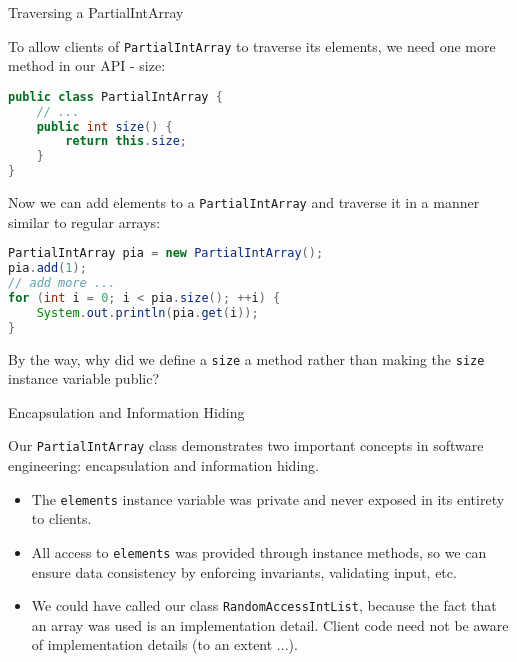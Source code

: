 \documentclass{beamer}
\begin{document}
\begin{frame}[fragile]{Traversing a PartialIntArray}


To allow clients of {\tt PartialIntArray} to traverse its elements, we need one more method in our API - size:
\begin{lstlisting}[language=Java]
public class PartialIntArray {
    // ...
    public int size() {
        return this.size;
    }
}
\end{lstlisting}
Now we can add elements to a {\tt PartialIntArray} and traverse it in a manner similar to regular arrays:
\vspace{-.05in}
\begin{lstlisting}[language=Java]
PartialIntArray pia = new PartialIntArray();
pia.add(1);
// add more ...
for (int i = 0; i < pia.size(); ++i) {
    System.out.println(pia.get(i));
}
\end{lstlisting}
\vspace{-.05in}
By the way, why did we define a {\tt size} a method rather than making the {\tt size} instance variable public?

\end{frame}

\begin{frame}[fragile]{Encapsulation and Information Hiding}


Our {\tt PartialIntArray} class demonstrates two important concepts in software engineering: encapsulation and information hiding.

\begin{itemize}
\item The {\tt elements} instance variable was private and never exposed in its entirety to clients.
\item All access to {\tt elements} was provided through instance methods, so we can ensure data consistency by enforcing invariants, validating input, etc.
\item We could have called our class {\tt RandomAccessIntList}, because the fact that an array was used is an implementation detail.  Client code need not be aware of implementation details (to an extent ...).
\end{itemize}


\end{frame}
\end{document}
